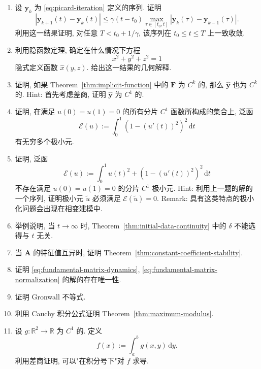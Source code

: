 \begin{enumerate}[label=\thesection.\arabic*.,ref=\thesection.\arabic*,series=book-problems]

\item\label{ex:picard-uniform-convergence} 设 $\bm{y}_k$ 为 \eqref{eq:picard-iteration} 定义的序列. 证明
\[
|\bm{y}_{k+1}(t)-\bm{y}_k(t)|\leq\gamma(t-t_0)\max_{\tau\in[t_0,t]}|\bm{y}_k(\tau)-\bm{y}_{k-1}(\tau)|.
\]
利用这一结果证明, 对任意 $T<t_0+1/\gamma$, 该序列在 $t_0\leq t\leq T$ 上一致收敛.

\item\label{ex:sphere-implicit-function} 利用隐函数定理, 确定在什么情况下方程
\[
x^2+y^2+z^2=1
\]
隐式定义函数 $\hat{x}(y,z)$. 给出这一结果的几何解释.

\item\label{ex:implicit-function-regularity} 证明, 如果 Theorem~\ref{thm:implicit-function} 中的 $\bm{F}$ 为 $C^k$ 的, 那么 $\hat{\bm{y}}$ 也为 $C^k$ 的. Hint: 首先考虑差商, 证明 $\hat{\bm{y}}$ 为 $C^1$ 的.

\item\label{ex:nonunique-minimizers} 证明, 在满足 $u(0)=u(1)=0$ 的所有分片 $C^1$ 函数所构成的集合上, 泛函
\[
\mathcal{E}(u):=\int_0^1(1-(u'(t))^2)^2\,\mathrm{d}t
\]
有无穷多个极小元.

\item\label{ex:nonattained-minimum} 证明, 泛函
\[
\mathcal{E}(u):=\int_0^1u(t)^2+(1-(u'(t))^2)^2\,\mathrm{d}t
\]
不存在满足 $u(0)=u(1)=0$ 的分片 $C^1$ 极小元. Hint: 利用上一题的解的一个序列, 证明极小元 $\tilde{u}$ 必须满足 $\mathcal{E}(\tilde{u})=0$. Remark: 具有这类特点的极小化问题会出现在相变建模中.

\item\label{ex:nonuniform-initial-data-continuity} 举例说明, 当 $t\to\infty$ 时, Theorem~\ref{thm:initial-data-continuity} 中的 $\delta$ 不能选得与 $t$ 无关.

\item\label{ex:distinct-eigenvalue-stability} 当 $\bm{A}$ 的特征值互异时, 证明 Theorem~\ref{thm:constant-coefficient-stability}.

\item\label{ex:fundamental-matrix-existence} 证明 \eqref{eq:fundamental-matrix-dynamics}, \eqref{eq:fundamental-matrix-normalization} 的解的存在唯一性.

\item\label{ex:gronwall-proof} 证明 Gronwall 不等式.

\item\label{ex:maximum-modulus-from-cauchy} 利用 Cauchy 积分公式证明 Theorem~\ref{thm:maximum-modulus}.

\item\label{ex:differentiation-under-integral} 设 $g:\mathbb{R}^2\to\mathbb{R}$ 为 $C^1$ 的. 定义
\[
f(x):=\int_a^bg(x,y)\,\mathrm{d}y.
\]
利用差商证明, 可以"在积分号下"对 $f$ 求导.

\end{enumerate}

